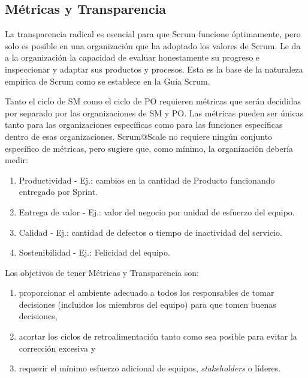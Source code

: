 \documentclass{article} %
\begin{document}
\noindent 

\noindent 

\noindent \eject 

\noindent 
\subsection{M\'{e}tricas y Transparencia}

\noindent 

\noindent La transparencia radical es esencial para que Scrum funcione \'{o}ptimamente, pero solo es posible en una organizaci\'{o}n que ha adoptado los valores de Scrum. Le da a la organizaci\'{o}n la capacidad de evaluar honestamente su progreso e inspeccionar y adaptar sus productos y procesos. Esta es la base de la naturaleza emp\'{i}rica de Scrum como se establece en la Gu\'{i}a Scrum. 

\noindent 

\noindent Tanto el ciclo de SM como el ciclo de PO requieren m\'{e}tricas que ser\'{a}n decididas por separado por las organizaciones de SM y PO. Las m\'{e}tricas pueden ser \'{u}nicas tanto para las organizaciones espec\'{i}ficas como para las funciones espec\'{i}ficas dentro de esas organizaciones. Scrum@Scale no requiere ning\'{u}n conjunto espec\'{i}fico de m\'{e}tricas, pero sugiere que, como m\'{i}nimo, la organizaci\'{o}n deber\'{i}a medir:

\noindent 

\begin{enumerate}
\item  Productividad - Ej.: cambios en la cantidad de Producto funcionando entregado por Sprint.

\item  Entrega de valor - Ej.: valor del negocio por unidad de esfuerzo del equipo.

\item  Calidad - Ej.: cantidad de defectos o tiempo de inactividad del servicio.

\item  Sostenibilidad - Ej.:  Felicidad del equipo.
\end{enumerate}

\noindent 

\noindent Los objetivos de tener M\'{e}tricas y Transparencia son:

\begin{enumerate}
\item  proporcionar el ambiente adecuado a todos los responsables de tomar decisiones (incluidos los miembros del equipo) para que tomen buenas decisiones,

\item  acortar los ciclos de retroalimentaci\'{o}n tanto como sea posible para evitar la correcci\'{o}n excesiva y

\item  requerir el m\'{i}nimo esfuerzo adicional de equipos, \textit{stakeholders }o l\'{i}deres.
\end{enumerate}
\end{document}
